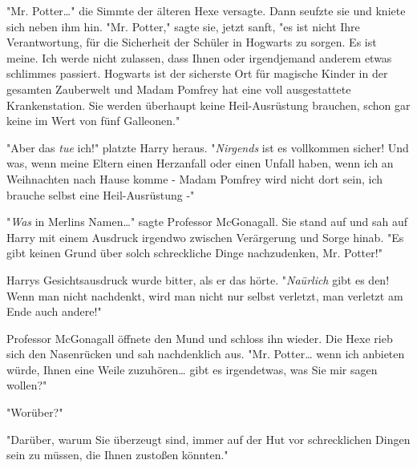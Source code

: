 {"Mr. Potter…" die Simmte der älteren Hexe versagte. Dann seufzte sie und kniete sich neben ihm hin. "Mr. Potter," sagte sie, jetzt sanft, "es ist nicht Ihre Verantwortung, für die Sicherheit der Schüler in Hogwarts zu sorgen. Es ist meine. Ich werde nicht zulassen, dass Ihnen oder irgendjemand anderem etwas schlimmes passiert. Hogwarts ist der sicherste Ort für magische Kinder in der gesamten Zauberwelt und Madam Pomfrey hat eine voll ausgestattete Krankenstation. Sie werden überhaupt keine Heil-Ausrüstung brauchen, schon gar keine im Wert von fünf Galleonen."

"Aber das \emph{tue} ich!" platzte Harry heraus. "\emph{Nirgends} ist es vollkommen sicher! Und was, wenn meine Eltern einen Herzanfall oder einen Unfall haben, wenn ich an Weihnachten nach Hause komme - Madam Pomfrey wird nicht dort sein, ich brauche selbst eine Heil-Ausrüstung -"

"\emph{Was} in Merlins Namen…" sagte Professor McGonagall. Sie stand auf und sah auf Harry mit einem Ausdruck irgendwo zwischen Verärgerung und Sorge hinab. "Es gibt keinen Grund über solch schreckliche Dinge nachzudenken, Mr. Potter!"

Harrys Gesichtsausdruck wurde bitter, als er das hörte. "\emph{Naürlich} gibt es den! Wenn man nicht nachdenkt, wird man nicht nur selbst verletzt, man verletzt am Ende auch andere!"

Professor McGonagall öffnete den Mund und schloss ihn wieder. Die Hexe rieb sich den Nasenrücken und sah nachdenklich aus. "Mr. Potter… wenn ich anbieten würde, Ihnen eine Weile zuzuhören… gibt es irgendetwas, was Sie mir sagen wollen?"

"Worüber?"

"Darüber, warum Sie überzeugt sind, immer auf der Hut vor schrecklichen Dingen sein zu müssen, die Ihnen zustoßen könnten."

}
